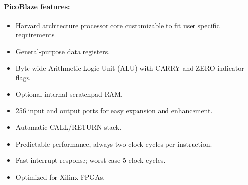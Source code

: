     \paragraph{PicoBlaze features:}
        \begin{itemize}
            \item Harvard architecture processor core customizable to fit user specific requirements.
            \item General-purpose data registers.
            \item Byte-wide Arithmetic Logic Unit (ALU) with CARRY and ZERO indicator flags.
            \item Optional internal scratchpad RAM.
            \item 256 input and output ports for easy expansion and enhancement.
            \item Automatic CALL/RETURN stack.
            \item Predictable performance, always two clock cycles per instruction.
            \item Fast interrupt response; worst-case 5 clock cycles.
            \item Optimized for Xilinx FPGAs.
        \end{itemize}
